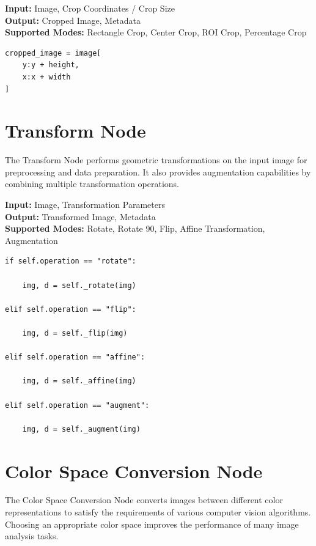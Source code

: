 \documentclass[a4paper,12pt]{report}
\begin{document}
\noindent \textbf{Input:} Image, Crop Coordinates / Crop Size \\
\textbf{Output:} Cropped Image, Metadata \\
\textbf{Supported Modes:} Rectangle Crop, Center Crop, ROI Crop, Percentage Crop

\begin{lstlisting}[caption={Core Algorithm}, label={lst:crop-node}]
cropped_image = image[
    y:y + height,
    x:x + width
]
\end{lstlisting}

\section{Transform Node}
\label{sec:transform-node}

The Transform Node performs geometric transformations on the input image
for preprocessing and data preparation. It also provides augmentation
capabilities by combining multiple transformation operations.

\noindent \textbf{Input:} Image, Transformation Parameters \\
\textbf{Output:} Transformed Image, Metadata \\
\textbf{Supported Modes:} Rotate, Rotate 90\textdegree, Flip, Affine Transformation, Augmentation

\begin{lstlisting}[caption={Core Algorithm}, label={lst:transform-node}]
if self.operation == "rotate":

    img, d = self._rotate(img)

elif self.operation == "flip":

    img, d = self._flip(img)

elif self.operation == "affine":

    img, d = self._affine(img)

elif self.operation == "augment":

    img, d = self._augment(img)
\end{lstlisting}

\section{Color Space Conversion Node}
\label{sec:color-space-conversion-node}

The Color Space Conversion Node converts images between different color
representations to satisfy the requirements of various computer vision
algorithms. Choosing an appropriate color space improves the performance
of many image analysis tasks.
\end{document}
